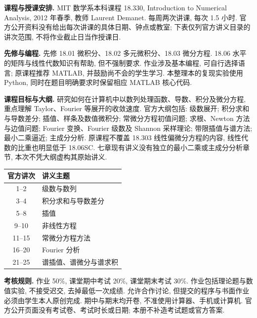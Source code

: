 {}
\par

\textbf{课程与授课安排.} MIT 数学系本科课程 18.330, Introduction to Numerical Analysis, 2012 年春季, 教师 Laurent Demanet. 每周两次讲课, 每次 1.5 小时. 官方公开资料没有给出每次讲课的具体日期、钟点或教室; 下表仅列官方讲义目录的讲次范围, 不将作业截止日当作授课日.

\textbf{先修与编程.} 先修 18.01 微积分、18.02 多元微积分、18.03 微分方程. 18.06 水平的矩阵与线性代数知识有帮助, 但不强制要求. 作业涉及基本编程, 可自行选择语言; 原课程推荐 MATLAB, 并鼓励尚不会的学生学习. 本整理本的复现实验使用 Python, 同时在题目明确要求时保留相应 MATLAB 核心代码.

\textbf{课程目标与大纲.} 研究如何在计算机中以数列处理函数、导数、积分及微分方程, 重点理解 Taylor、Fourier 等展开的收敛速度. 官方大纲包括: 级数展开; 积分求和与导数差分; 插值、样条及数值微积分; 常微分方程初值问题; 求根、Newton 方法与边值问题; Fourier 变换、Fourier 级数及 Shannon 采样理论; 带限插值与谱方法; 最小二乘逼近; 主成分分析. 原课程不覆盖 18.303 线性偏微分方程的内容, 线性代数的比重也明显低于 18.06SC. 七章现有讲义没有独立的最小二乘或主成分分析章节, 本次不凭大纲虚构其原始讲义.

\begin{center}
\begin{tabular}{cl}
\toprule
官方讲次 & 讲义主题 \\
\midrule
1--2 & 级数与数列 \\
3--4 & 积分求和与导数差分 \\
5--8 & 插值 \\
9--10 & 非线性方程 \\
11--15 & 常微分方程方法 \\
16--20 & Fourier 分析 \\
21--25 & 谱插值、谱微分与谱求积 \\
\bottomrule
\end{tabular}
\end{center}

\textbf{考核规则.} 作业 50\%, 课堂期中考试 20\%, 课堂期末考试 30\%. 作业包括理论题与数值实验, 不接受迟交, 去掉最低一次成绩. 允许合作讨论, 但提交的程序与书面作业必须由学生本人原创完成. 期中与期末均开卷, 不准使用计算器、手机或计算机. 官方公开页面没有考试卷、考试时长或日期; 本册不补造考试题或官方答案.

